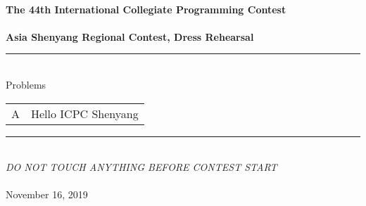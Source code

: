 \begin{titlepage}
\selectfont
\begin{center}
\Large{\textbf{
~\\%
The 44th International Collegiate Programming Contest\\%
~\\%
Asia Shenyang Regional Contest, Dress Rehearsal}}
\vfill
\begin{spacing}{1.2}
\rule{100mm}{1pt}\\
Problems
\begin{center}
\begin{tabular}{c|l}
    A & Hello ICPC Shenyang
\end{tabular}
\end{center}
\rule{100mm}{1pt}
\end{spacing}
\vfill
\Large{
~\\%
\textit{DO NOT TOUCH ANYTHING BEFORE CONTEST START}}\\%
~\\%
November 16, 2019
\end{center}
\end{titlepage}